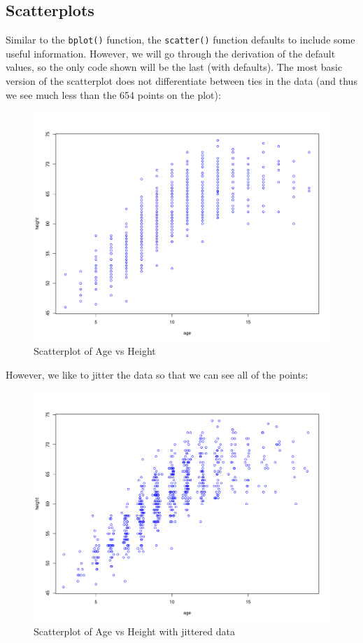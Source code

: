\documentclass[landscape]{article}
\begin{document}
\subsection{Scatterplots}
Similar to the \texttt{bplot()} function, the \texttt{scatter()} function defaults to include some useful information. However, we will go through the derivation of the default values, so the only code shown will be the last (with defaults). The most basic version of the scatterplot does not differentiate between ties in the data (and thus we see much less than the 654 points on the plot):\\
\begin{figure}[h]
\centering
\includegraphics[scale=.005]{fevdoc-scatter1}
\caption{Scatterplot of Age vs Height}
\label{scatter1}
\end{figure}
However, we like to jitter the data so that we can see all of the points:\\
\begin{figure}[h]
\centering
\includegraphics[scale=.005]{fevdoc-scatter2}
\caption{Scatterplot of Age vs Height with jittered data}
\label{scatter2}
\end{figure}
\end{document}
